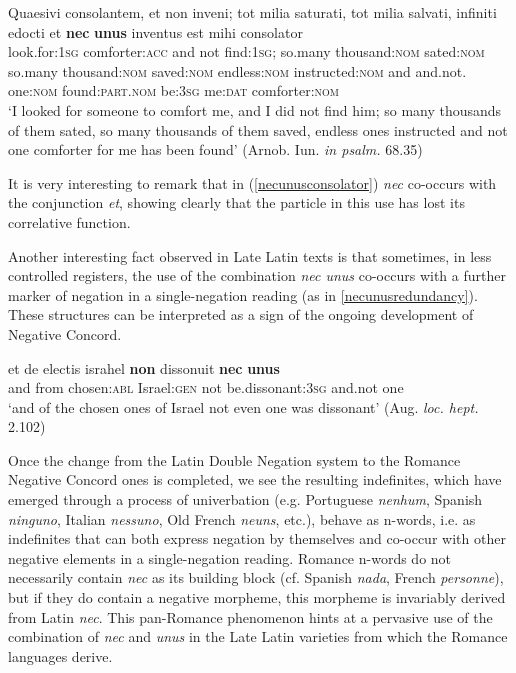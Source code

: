 \documentclass[output=paper,modfonts,nonflat,citecolor=brown,
showindex
]{langsci/langscibook}
\begin{document}
{\begin{exe}
\ex \label{necunusconsolator} \gll Quaesivi consolantem, et non inveni; tot milia saturati, tot milia salvati, infiniti edocti et {\textbf{nec}} {\textbf{unus}} inventus est mihi consolator\\
look.for:{\textsc{1sg}} comforter:{\textsc{acc}} and not find:{\textsc{1sg}}; so.many thousand:{\textsc{nom}} sated:{\textsc{nom}} so.many thousand:{\textsc{nom}} saved:{\textsc{nom}} endless:{\textsc{nom}} instructed:{\textsc{nom}} and and.not. one:{\textsc{nom}} found:{\textsc{part.nom}} be:{\textsc{3sg}} me:{\textsc{dat}} comforter:{\textsc{nom}}\\  

`I looked for someone to comfort me, and I did not find him; so many thousands of them sated, so many thousands of them saved, endless ones instructed and not one comforter for me has been found' (Arnob. Iun. {\emph{in psalm.}} 68.35)
\end{exe}}

\noindent It is very interesting to remark that in (\ref{necunusconsolator}) {\emph{nec}} co-occurs with the conjunction {\emph{et}}, showing clearly that the particle in this use has lost its correlative function.

Another interesting fact observed in Late Latin texts is that sometimes, in less controlled registers, the use of the combination {\emph{nec unus}} co-occurs with a further marker of negation in a single-negation reading (as in \ref{necunusredundancy}). These structures can be interpreted as a sign of the ongoing development of Negative Concord.

{\begin{exe}
\ex \label{necunusredundancy} \gll et de electis israhel {\textbf{non}} dissonuit {\textbf{nec}} {\textbf{unus}}\\
and from chosen:{\textsc{abl}} Israel:{\textsc{gen}} not be.dissonant:{\textsc{3sg}} and.not one\\ 

`and of the chosen ones of Israel not even one was dissonant' (Aug. {\emph{loc. hept.}} 2.102)
\end{exe}}

\noindent Once the change from the Latin Double Negation system to the Romance Negative Concord ones is completed, we see the resulting indefinites, which have emerged through a process of univerbation (e.g. Portuguese {\emph{nenhum}}, Spanish {\emph{ninguno}}, Italian {\emph{nessuno}}, Old French {\emph{neuns}}, etc.), behave as n-words, i.e. as indefinites that can both express negation by themselves and co-occur with other negative elements in a single-negation reading. Romance n-words do not necessarily contain {\emph{nec}} as its building block (cf. Spanish {\emph{nada}}, French {\emph{personne}}), but if they do contain a negative morpheme, this morpheme is invariably derived from Latin {\emph{nec}}. This pan-Romance phenomenon hints at a pervasive use of the combination of {\emph{nec}} and {\emph{unus}} in the Late Latin varieties from which the Romance languages derive.
\end{document}
